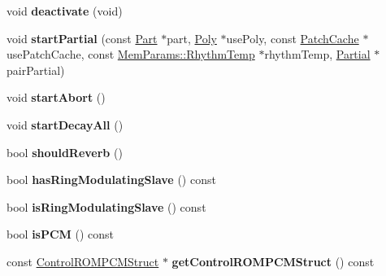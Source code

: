 \begin{DoxyCompactItemize}
\item 
\hypertarget{classMT32Emu_1_1Partial_a3b24766d3398da3da9cec2d27df43b59}{void {\bfseries deactivate} (void)}\label{classMT32Emu_1_1Partial_a3b24766d3398da3da9cec2d27df43b59}

\item 
\hypertarget{classMT32Emu_1_1Partial_ad8e4f9db791ac1931ca0d79806e93bbc}{void {\bfseries start\-Partial} (const \hyperlink{classMT32Emu_1_1Part}{Part} $\ast$part, \hyperlink{classMT32Emu_1_1Poly}{Poly} $\ast$use\-Poly, const \hyperlink{structMT32Emu_1_1PatchCache}{Patch\-Cache} $\ast$use\-Patch\-Cache, const \hyperlink{structMT32Emu_1_1MemParams_1_1RhythmTemp}{Mem\-Params\-::\-Rhythm\-Temp} $\ast$rhythm\-Temp, \hyperlink{classMT32Emu_1_1Partial}{Partial} $\ast$pair\-Partial)}\label{classMT32Emu_1_1Partial_ad8e4f9db791ac1931ca0d79806e93bbc}

\item 
\hypertarget{classMT32Emu_1_1Partial_afccccff50693629ef1f7cbb6c123a3ea}{void {\bfseries start\-Abort} ()}\label{classMT32Emu_1_1Partial_afccccff50693629ef1f7cbb6c123a3ea}

\item 
\hypertarget{classMT32Emu_1_1Partial_a87f7fa76409f8119f6295514877d056a}{void {\bfseries start\-Decay\-All} ()}\label{classMT32Emu_1_1Partial_a87f7fa76409f8119f6295514877d056a}

\item 
\hypertarget{classMT32Emu_1_1Partial_a0c620050630ff24d90e8316ecbfa1d0e}{bool {\bfseries should\-Reverb} ()}\label{classMT32Emu_1_1Partial_a0c620050630ff24d90e8316ecbfa1d0e}

\item 
\hypertarget{classMT32Emu_1_1Partial_a81348785ad53a4324e295529909d30a1}{bool {\bfseries has\-Ring\-Modulating\-Slave} () const }\label{classMT32Emu_1_1Partial_a81348785ad53a4324e295529909d30a1}

\item 
\hypertarget{classMT32Emu_1_1Partial_a71243503ea655f8c0924e450d112743f}{bool {\bfseries is\-Ring\-Modulating\-Slave} () const }\label{classMT32Emu_1_1Partial_a71243503ea655f8c0924e450d112743f}

\item 
\hypertarget{classMT32Emu_1_1Partial_a65b9dd46e0fb9876aa91f3020410905f}{bool {\bfseries is\-P\-C\-M} () const }\label{classMT32Emu_1_1Partial_a65b9dd46e0fb9876aa91f3020410905f}

\item 
\hypertarget{classMT32Emu_1_1Partial_a4c9c6f517ca1b7b2550463e88dc45016}{const \hyperlink{structMT32Emu_1_1ControlROMPCMStruct}{Control\-R\-O\-M\-P\-C\-M\-Struct} $\ast$ {\bfseries get\-Control\-R\-O\-M\-P\-C\-M\-Struct} () const }\label{classMT32Emu_1_1Partial_a4c9c6f517ca1b7b2550463e88dc45016}


\end{DoxyCompactItemize}
